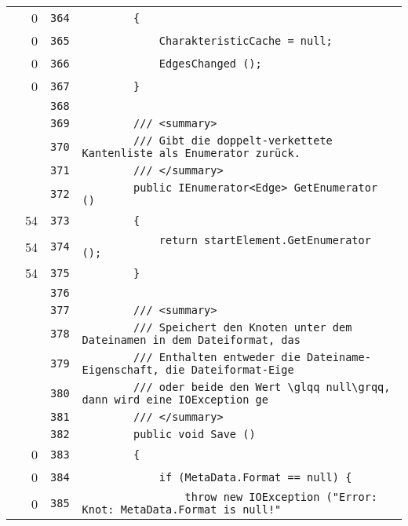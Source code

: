 \documentclass[a4paper,10pt]{article}
\begin{document}
\begin{longtable}[l]{lrrl}
\cellcolor{red} & 0 & \verb~364~ & \verb~        {~\\
\cellcolor{red} & 0 & \verb~365~ & \verb~            CharakteristicCache = null;~\\
\cellcolor{red} & 0 & \verb~366~ & \verb~            EdgesChanged ();~\\
\cellcolor{red} & 0 & \verb~367~ & \verb~        }~\\
\cellcolor{gray} &  & \verb~368~ & \verb~~\\
\cellcolor{gray} &  & \verb~369~ & \verb~        /// <summary>~\\
\cellcolor{gray} &  & \verb~370~ & \verb~        /// Gibt die doppelt-verkettete Kantenliste als Enumerator zurück.~\\
\cellcolor{gray} &  & \verb~371~ & \verb~        /// </summary>~\\
\cellcolor{gray} &  & \verb~372~ & \verb~        public IEnumerator<Edge> GetEnumerator ()~\\
\cellcolor{green} & 54 & \verb~373~ & \verb~        {~\\
\cellcolor{green} & 54 & \verb~374~ & \verb~            return startElement.GetEnumerator ();~\\
\cellcolor{green} & 54 & \verb~375~ & \verb~        }~\\
\cellcolor{gray} &  & \verb~376~ & \verb~~\\
\cellcolor{gray} &  & \verb~377~ & \verb~        /// <summary>~\\
\cellcolor{gray} &  & \verb~378~ & \verb~        /// Speichert den Knoten unter dem Dateinamen in dem Dateiformat, das ~\\
\cellcolor{gray} &  & \verb~379~ & \verb~        /// Enthalten entweder die Dateiname-Eigenschaft, die Dateiformat-Eige~\\
\cellcolor{gray} &  & \verb~380~ & \verb~        /// oder beide den Wert \glqq null\grqq, dann wird eine IOException ge~\\
\cellcolor{gray} &  & \verb~381~ & \verb~        /// </summary>~\\
\cellcolor{gray} &  & \verb~382~ & \verb~        public void Save ()~\\
\cellcolor{red} & 0 & \verb~383~ & \verb~        {~\\
\cellcolor{red} & 0 & \verb~384~ & \verb~            if (MetaData.Format == null) {~\\
\cellcolor{red} & 0 & \verb~385~ & \verb~                throw new IOException ("Error: Knot: MetaData.Format is null!"~\\

\end{longtable}
\end{document}
